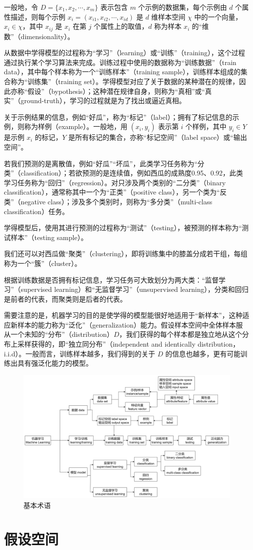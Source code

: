 \documentclass[12pt, a4paper]{article} %
\begin{document}
一般地，令 $D = \{x_1, x_2, \cdots, x_m\}$ 表示包含 $m$ 个示例的数据集，每个示例由 $d$ 个属性描述，则每个示例 $x_i = (x_{i1}, x_{i2}, \cdots, x_{id})$ 是 $d$ 维样本空间 $\chi$ 中的一个向量，$x_i \in \chi$，其中 $x_{ij}$ 是 $x_i$ 在第 $j$ 个属性上的取值，$d$ 称为样本 $x_i$ 的“维数”（dimensionality）。

从数据中学得模型的过程称为“学习”（learning）或“训练”（training），这个过程通过执行某个学习算法来完成。训练过程中使用的数据称为“训练数据”（train data），其中每个样本称为一个“训练样本”（training sample），训练样本组成的集合称为“训练集”（training set）。学得模型对应了关于数据的某种潜在的规律，因此亦称“假设”（bypothesis）；这种潜在规律自身，则称为“真相”或“真实”（ground-truth），学习的过程就是为了找出或逼近真相。

关于示例结果的信息，例如“好瓜”，称为“标记”（label）；拥有了标记信息的示例，则称为样例（example）。一般地，用 $(x_i, y_i)$ 表示第 $i$ 个样例，其中 $y_i \in Y$ 是示例 $x_i$ 的标记，$Y$ 是所有标记的集合，亦称“标记空间”（label space）或“输出空间”。

若我们预测的是离散值，例如“好瓜”“坏瓜”，此类学习任务称为“分类”（classification）；若欲预测的是连续值，例如西瓜的成熟度0.95、0.92，此类学习任务称为“回归”（regression）。对只涉及两个类别的“二分类”（binary classification），通常称其中一个为“正类”（positive class），另一个类为“反类”（negative class）；涉及多个类别时，则称为“多分类”（multi-class classification）任务。

学得模型后，使用其进行预测的过程称为“测试”（testing），被预测的样本称为“测试样本”（testing sample）。

我们还可以对西瓜做“聚类”（clustering），即将训练集中的膝盖分成若干组，每组称为一个“簇”（cluster）。

根据训练数据是否拥有标记信息，学习任务可大致划分为两大类：“监督学习”（supervised learning）和“无监督学习”（unsupervised learning），分类和回归是前者的代表，而聚类则是后者的代表。

需要注意的是，机器学习的目的是使学得的模型能很好地适用于“新样本”，这种适应新样本的能力称为“泛化”（generalization）能力。假设样本空间中全体样本服从一个未知的“分布”（distribution）$D$，我们获得的每个样本都是独立地从这个分布上采样获得的，即“独立同分布”（independent and identically distribution，i.i.d）。一般而言，训练样本越多，我们得到的关于 $D$ 的信息也越多，更有可能训练出具有强泛化能力的模型。

\begin{figure}[H]
    \centering
    \includegraphics[width=1\textwidth]{../img/1-1-基本术语.drawio.png}
    \caption{基本术语}
    \label{fig:1-1-基本术语.drawio.png}
\end{figure}

\section{假设空间}
\end{document}
